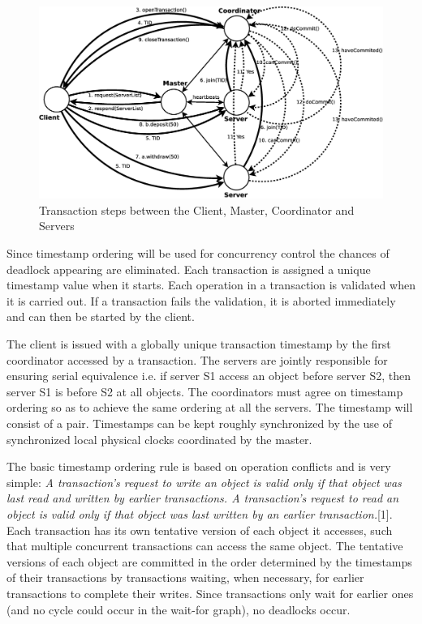 \documentclass[times, 10pt,twocolumn]{article}
\begin{document}
\begin{figure}
\centering
\includegraphics[scale=0.2]{transaction.eps}
\caption{Transaction steps between the Client, Master, Coordinator and Servers}
\label{fig:transa}
\end{figure}



\label{subsec:dldetect}
Since timestamp ordering will be used for concurrency control the chances of deadlock appearing are eliminated.
Each transaction is assigned a unique timestamp value when it starts. Each operation in a transaction is validated when it is carried out.
If a transaction fails the validation, it is aborted immediately and can then be started by the client. 

The client is issued with a globally unique transaction timestamp by the first coordinator accessed
by a transaction. The servers are jointly responsible for ensuring serial equivalence i.e. if server S1 access an object before server S2, then server S1 is before S2 at all objects. The coordinators
must agree on timestamp ordering so as to achieve the same ordering at all the servers. The timestamp will consist of a {\it <local timestamp, server-id> } pair. Timestamps can be kept roughly synchronized
by the use of synchronized local physical clocks coordinated by the master.

The basic timestamp ordering rule is based on operation conflicts and is very simple:
{\it A transaction’s request to write an object is valid only if that object was last read and written by earlier transactions. A transaction’s request to read an object is valid only if that object was
last written by an earlier transaction.}[1]. Each transaction has its own tentative version of each object it accesses, such that multiple concurrent transactions can access the same object. The tentative
versions of each object are committed in the order determined by the timestamps of their transactions by transactions waiting, when necessary, for earlier transactions to complete their writes.
Since transactions only wait for earlier ones (and no cycle could occur in the wait-for graph), no deadlocks occur.
\end{document}
